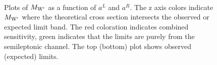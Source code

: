 \begin{figure}[htcb]
\begin{center}
\\
\caption{
Plots of $M_{\mathrm{W}^\prime}$ as a function of $a^L$ and $a^R$.  The z axis colors indicate $M_{\mathrm{W}^\prime}$ where the theoretical cross section intersects the observed or expected limit band.  The red coloration indicates combined sensitivity, green indicates that the limits are purely from the semileptonic channel.  The top (bottom) plot shows observed (expected) limits.
}
\label{figs:GCLimcombo}
\end{center}
\end{figure}


\clearpage
